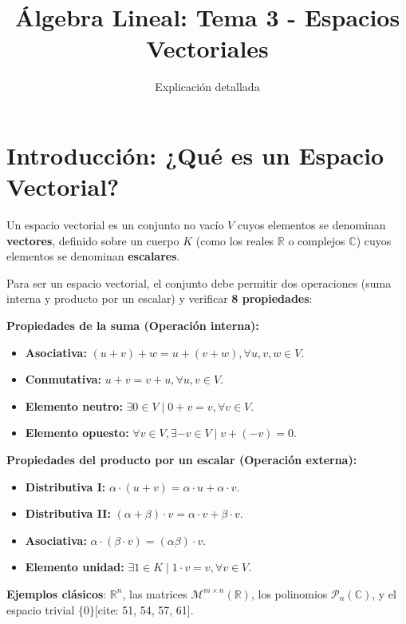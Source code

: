 \documentclass[12pt,a4paper]{article}
\title{Álgebra Lineal: Tema 3 - Espacios Vectoriales}
\author{Explicación detallada}
\date{}
\begin{document}
\maketitle

\section{Introducción: ¿Qué es un Espacio Vectorial?}
Un espacio vectorial es un conjunto no vacío $V$ cuyos elementos se denominan \textbf{vectores}, definido sobre un cuerpo $K$ (como los reales $\mathbb{R}$ o complejos $\mathbb{C}$) cuyos elementos se denominan \textbf{escalares}.

Para ser un espacio vectorial, el conjunto debe permitir dos operaciones (suma interna y producto por un escalar) y verificar \textbf{8 propiedades}:

\textbf{Propiedades de la suma (Operación interna):}
\begin{itemize}
    \item \textbf{Asociativa:} $(u+v)+w = u+(v+w), \forall u,v,w \in V$.
    \item \textbf{Conmutativa:} $u+v = v+u, \forall u,v \in V$.
    \item \textbf{Elemento neutro:} $\exists 0 \in V \mid 0+v = v, \forall v \in V$.
    \item \textbf{Elemento opuesto:} $\forall v \in V, \exists -v \in V \mid v + (-v) = 0$.
\end{itemize}

\textbf{Propiedades del producto por un escalar (Operación externa):}
\begin{itemize}
    \item \textbf{Distributiva I:} $\alpha \cdot (u+v) = \alpha \cdot u + \alpha \cdot v$.
    \item \textbf{Distributiva II:} $(\alpha+\beta) \cdot v = \alpha \cdot v + \beta \cdot v$.
    \item \textbf{Asociativa:} $\alpha \cdot (\beta \cdot v) = (\alpha\beta) \cdot v$.
    \item \textbf{Elemento unidad:} $\exists 1 \in K \mid 1 \cdot v = v, \forall v \in V$.
\end{itemize}

\textbf{Ejemplos clásicos}: 
$\mathbb{R}^n$, las matrices $\mathcal{M}^{m\times n}(\mathbb{R})$, los polinomios $\mathcal{P}_n(\mathbb{C})$, y el espacio trivial $\{0\}$[cite: 51, 54, 57, 61].
\end{document}
